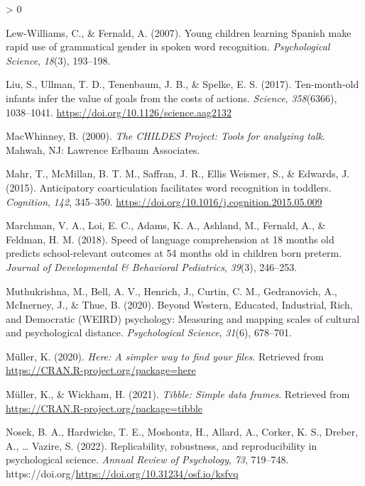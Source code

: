 \documentclass[
  english,
  man,floatsintext]{apa6}
\newlength{\cslhangindent}
\newenvironment{CSLReferences}[2] %
 {%
  \setlength{\parindent}{0pt}
  \ifodd #1 \everypar{\setlength{\hangindent}{\cslhangindent}}\ignorespaces\fi
  \ifnum #2 > 0
  \setlength{\parskip}{#2\baselineskip}
  \fi
 }%
 {}
\begin{document}
\begin{CSLReferences}{1}{0}
\leavevmode\hypertarget{ref-lewwilliams2007}{}%
Lew-Williams, C., \& Fernald, A. (2007). {Young children learning Spanish make rapid use of grammatical gender in spoken word recognition}. \emph{Psychological Science}, \emph{18}(3), 193--198.

\leavevmode\hypertarget{ref-Liu2017}{}%
Liu, S., Ullman, T. D., Tenenbaum, J. B., \& Spelke, E. S. (2017). {Ten-month-old infants infer the value of goals from the costs of actions}. \emph{Science}, \emph{358}(6366), 1038--1041. \url{https://doi.org/10.1126/science.aag2132}

\leavevmode\hypertarget{ref-macwhinney2000}{}%
MacWhinney, B. (2000). \emph{{The CHILDES Project: Tools for analyzing talk}}. Mahwah, NJ: Lawrence Erlbaum Associates.

\leavevmode\hypertarget{ref-Mahr2015}{}%
Mahr, T., McMillan, B. T. M., Saffran, J. R., Ellis Weismer, S., \& Edwards, J. (2015). {Anticipatory coarticulation facilitates word recognition in toddlers}. \emph{Cognition}, \emph{142}, 345--350. \url{https://doi.org/10.1016/j.cognition.2015.05.009}

\leavevmode\hypertarget{ref-marchman2018}{}%
Marchman, V. A., Loi, E. C., Adams, K. A., Ashland, M., Fernald, A., \& Feldman, H. M. (2018). {Speed of language comprehension at 18 months old predicts school-relevant outcomes at 54 months old in children born preterm}. \emph{Journal of Developmental {\&} Behavioral Pediatrics}, \emph{39}(3), 246--253.

\leavevmode\hypertarget{ref-muthukrishna2020}{}%
Muthukrishna, M., Bell, A. V., Henrich, J., Curtin, C. M., Gedranovich, A., McInerney, J., \& Thue, B. (2020). {Beyond Western, Educated, Industrial, Rich, and Democratic (WEIRD) psychology: Measuring and mapping scales of cultural and psychological distance}. \emph{Psychological Science}, \emph{31}(6), 678--701.

\leavevmode\hypertarget{ref-R-here}{}%
Müller, K. (2020). \emph{Here: A simpler way to find your files}. Retrieved from \url{https://CRAN.R-project.org/package=here}

\leavevmode\hypertarget{ref-R-tibble}{}%
Müller, K., \& Wickham, H. (2021). \emph{Tibble: Simple data frames}. Retrieved from \url{https://CRAN.R-project.org/package=tibble}

\leavevmode\hypertarget{ref-Nosek2021}{}%
Nosek, B. A., Hardwicke, T. E., Moshontz, H., Allard, A., Corker, K. S., Dreber, A., \ldots{} Vazire, S. (2022). {Replicability, robustness, and reproducibility in psychological science.} \emph{Annual Review of Psychology}, \emph{73}, 719--748. https://doi.org/\url{https://doi.org/10.31234/osf.io/ksfvq}


\end{CSLReferences}
\end{document}
